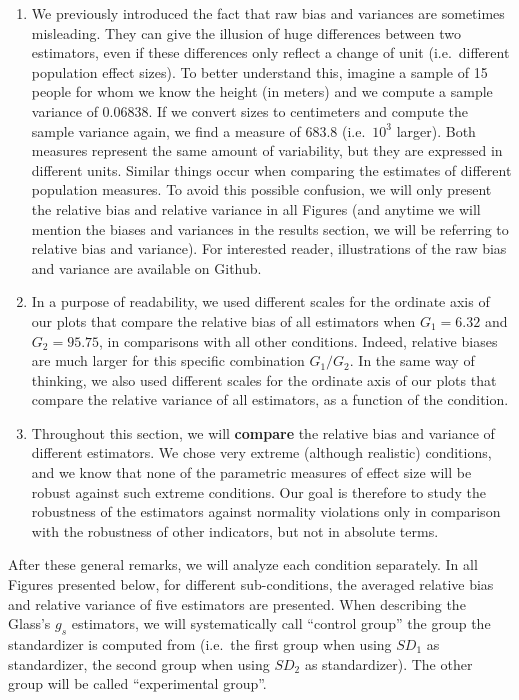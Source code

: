 \documentclass[
  man,floatsintext]{apa6}
\begin{document}
\begin{enumerate}
\def\labelenumi{\arabic{enumi})}
\item
  We previously introduced the fact that raw bias and variances are sometimes misleading. They can give the illusion of huge differences between two estimators, even if these differences only reflect a change of unit (i.e.~different population effect sizes). To better understand this, imagine a sample of 15 people for whom we know the height (in meters) and we compute a sample variance of 0.06838. If we convert sizes to centimeters and compute the sample variance again, we find a measure of 683.8 (i.e.~\(10^3\) larger). Both measures represent the same amount of variability, but they are expressed in different units. Similar things occur when comparing the estimates of different population measures. To avoid this possible confusion, we will only present the relative bias and relative variance in all Figures (and anytime we will mention the biases and variances in the results section, we will be referring to relative bias and variance). For interested reader, illustrations of the raw bias and variance are available on Github.
\item
  In a purpose of readability, we used different scales for the ordinate axis of our plots that compare the relative bias of all estimators when \(G_1 = 6.32\) and \(G_2 = 95.75\), in comparisons with all other conditions. Indeed, relative biases are much larger for this specific combination \(G_1/G_2\). In the same way of thinking, we also used different scales for the ordinate axis of our plots that compare the relative variance of all estimators, as a function of the condition.
\item
  Throughout this section, we will \textbf{compare} the relative bias and variance of different estimators. We chose very extreme (although realistic) conditions, and we know that none of the parametric measures of effect size will be robust against such extreme conditions. Our goal is therefore to study the robustness of the estimators against normality violations only in comparison with the robustness of other indicators, but not in absolute terms.
\end{enumerate}

After these general remarks, we will analyze each condition separately. In all Figures presented below, for different sub-conditions, the averaged relative bias and relative variance of five estimators are presented. When describing the Glass's \(g_s\) estimators, we will systematically call \enquote{control group} the group the standardizer is computed from (i.e.~the first group when using \(SD_1\) as standardizer, the second group when using \(SD_2\) as standardizer). The other group will be called \enquote{experimental group}.
\end{document}
